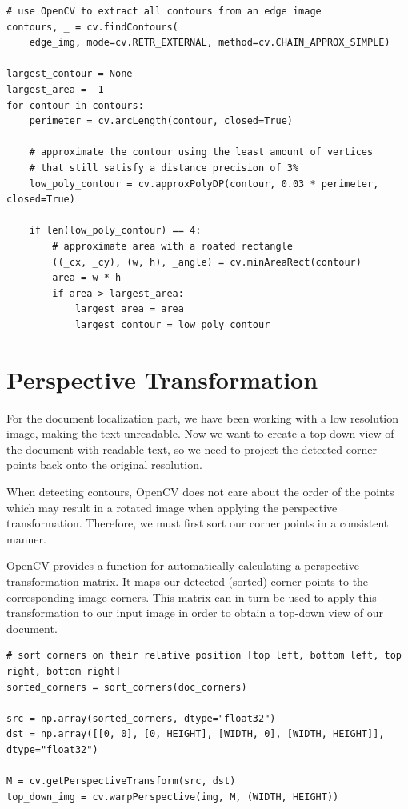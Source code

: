 \documentclass[bibliography=totoc]{scrartcl}
\begin{document}
\lstset{language=Python}
\lstset{frame=lines}
\lstset{basicstyle=\footnotesize}
\begin{lstlisting}
# use OpenCV to extract all contours from an edge image
contours, _ = cv.findContours(
	edge_img, mode=cv.RETR_EXTERNAL, method=cv.CHAIN_APPROX_SIMPLE)

largest_contour = None
largest_area = -1
for contour in contours:
	perimeter = cv.arcLength(contour, closed=True)
	
	# approximate the contour using the least amount of vertices 
	# that still satisfy a distance precision of 3%
	low_poly_contour = cv.approxPolyDP(contour, 0.03 * perimeter, closed=True)

	if len(low_poly_contour) == 4:
		# approximate area with a roated rectangle
		((_cx, _cy), (w, h), _angle) = cv.minAreaRect(contour)
		area = w * h
		if area > largest_area:
			largest_area = area
			largest_contour = low_poly_contour
	\end{lstlisting}


\section{Perspective Transformation}
For the document localization part, we have been working with a low resolution image, making the text unreadable.
Now we want to create a top-down view of the document with readable text, so we need to project the detected corner points back onto the original resolution.

When detecting contours, OpenCV does not care about the order of the points which may result in a rotated image when applying the perspective transformation.
Therefore, we must first sort our corner points in a consistent manner.

OpenCV provides a function for automatically calculating a perspective transformation matrix.
It maps our detected (sorted) corner points to the corresponding image corners.
This matrix can in turn be used to apply this transformation to our input image in order to obtain a top-down view of our document.\\

\lstset{language=Python}
\lstset{frame=lines}
\lstset{basicstyle=\footnotesize}
\begin{lstlisting}
# sort corners on their relative position [top left, bottom left, top right, bottom right]
sorted_corners = sort_corners(doc_corners)

src = np.array(sorted_corners, dtype="float32")
dst = np.array([[0, 0], [0, HEIGHT], [WIDTH, 0], [WIDTH, HEIGHT]], dtype="float32")

M = cv.getPerspectiveTransform(src, dst)
top_down_img = cv.warpPerspective(img, M, (WIDTH, HEIGHT))
	\end{lstlisting}
\end{document}
